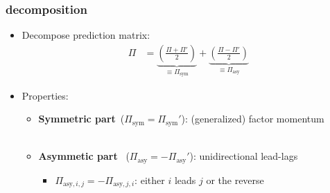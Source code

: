 \documentclass[10pt]{beamer}
\begin{document}
\begin{frame}[label=decomposition]
\frametitle{\citet{kelly2023principal} decomposition}
\begin{itemize}
	\item Decompose prediction matrix:
	\begin{align*}
    \Pi &= \underbrace{\left(\frac{\Pi+\Pi'}{2}\right)}_{\equiv \Pi_\text{sym}} + \underbrace{\left(\frac{\Pi-\Pi'}{2}\right)}_{\equiv \Pi_\text{asy}}
    \end{align*}
	
    \item Properties:
    \begin{itemize}
        \item \textbf{Symmetric part}~($\Pi_\text{sym} = \Pi_\text{sym}'$): (generalized) factor momentum \\ ~\hfill \hyperlink{understanding_sym}{}
        \vspace{20pt}

    \item \textbf{Asymmetic part} ~($\Pi_\text{asy} = -\Pi_\text{asy}'$): unidirectional lead-lags
        \begin{itemize}
        \item $\Pi_{\text{asy},i,j} = - \Pi_{\text{asy},j,i}$: either $i$ leads $j$ or the reverse
        \end{itemize}
    \end{itemize} 
\end{itemize}
\vspace{20pt}
\end{frame}
\end{document}
